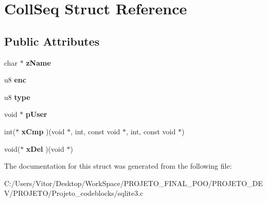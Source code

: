 \hypertarget{struct_coll_seq}{\section{Coll\-Seq Struct Reference}
\label{struct_coll_seq}
}
\subsection*{Public Attributes}
\begin{DoxyCompactItemize}
\item 
\hypertarget{struct_coll_seq_a48d6d5f71d4f8a3ab122903464e8b4a1}{char $\ast$ {\bfseries z\-Name}}\label{struct_coll_seq_a48d6d5f71d4f8a3ab122903464e8b4a1}

\item 
\hypertarget{struct_coll_seq_add27da1a70ed6f538447e9183eeb4838}{u8 {\bfseries enc}}\label{struct_coll_seq_add27da1a70ed6f538447e9183eeb4838}

\item 
\hypertarget{struct_coll_seq_ae8e3e561c3ff15d81758530573ceb5f9}{u8 {\bfseries type}}\label{struct_coll_seq_ae8e3e561c3ff15d81758530573ceb5f9}

\item 
\hypertarget{struct_coll_seq_a3cee924d41e730ccec7f686eb5b6f041}{void $\ast$ {\bfseries p\-User}}\label{struct_coll_seq_a3cee924d41e730ccec7f686eb5b6f041}

\item 
\hypertarget{struct_coll_seq_a47fc6d3a01eee354332ca515a8b493ce}{int($\ast$ {\bfseries x\-Cmp} )(void $\ast$, int, const void $\ast$, int, const void $\ast$)}\label{struct_coll_seq_a47fc6d3a01eee354332ca515a8b493ce}

\item 
\hypertarget{struct_coll_seq_a1c0dd3ad98c7bb2ef517f9170134a125}{void($\ast$ {\bfseries x\-Del} )(void $\ast$)}\label{struct_coll_seq_a1c0dd3ad98c7bb2ef517f9170134a125}

\end{DoxyCompactItemize}


The documentation for this struct was generated from the following file\-:\begin{DoxyCompactItemize}
\item 
C\-:/\-Users/\-Vitor/\-Desktop/\-Work\-Space/\-P\-R\-O\-J\-E\-T\-O\-\_\-\-F\-I\-N\-A\-L\-\_\-\-P\-O\-O/\-P\-R\-O\-J\-E\-T\-O\-\_\-\-D\-E\-V/\-P\-R\-O\-J\-E\-T\-O/\-Projeto\-\_\-codeblocks/sqlite3.\-c\end{DoxyCompactItemize}
